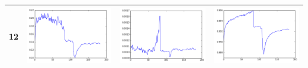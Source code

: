 \documentclass[14pt, a4paper]{extarticle}
\begin{document}
\begin{table}[!htb]
{\begin{tabular}{|c|c|c|c|}
\hline
12 & \includegraphics[scale=0.3]{images/ks_12.png} & \includegraphics[scale=0.3]{images/cvm_12.png} & \includegraphics[scale=0.3]{images/auc_12.png} \\
\hline
\end{tabular}
}
\end{table}
\end{document}
